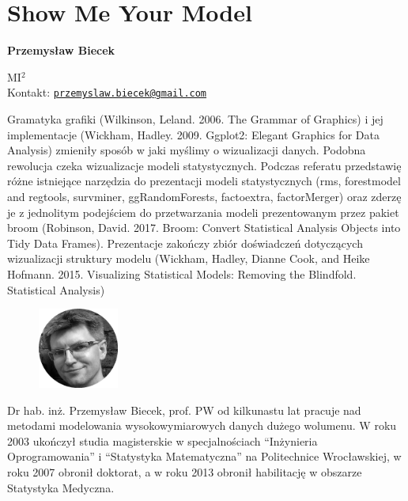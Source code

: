 \documentclass[\main/boa.tex]{subfiles}
\begin{document}
\section{Show Me Your Model}


\begin{minipage}{0.915\textwidth}
	\centering
  {\bf \LARGE {} Przemysław Biecek}
\end{minipage}

\begin{affiliations}
\begin{minipage}{0.915\textwidth}
\centering
\large MI$^{2}$  \\[1pt]
Kontakt: \href{mailto:przemyslaw.biecek@gmail.com}{\nolinkurl{przemyslaw.biecek@gmail.com}}\\
\end{minipage}
\end{affiliations}


Gramatyka grafiki (Wilkinson, Leland. 2006. The Grammar of Graphics) i jej implementacje (Wickham, Hadley. 2009. Ggplot2: Elegant Graphics for Data Analysis) zmieniły sposób w jaki myślimy o wizualizacji danych. Podobna rewolucja czeka wizualizacje modeli statystycznych. Podczas referatu przedstawię różne istniejące narzędzia do prezentacji modeli statystycznych (rms, forestmodel and regtools, survminer, \break ggRandomForests, factoextra, factorMerger) oraz zderzę je z jednolitym podejściem do przetwarzania modeli prezentowanym przez pakiet broom (Robinson, David. 2017. Broom: Convert Statistical Analysis Objects into Tidy Data Frames). Prezentacje zakończy zbiór doświadczeń dotyczących wizualizacji struktury modelu (Wickham, Hadley, Dianne Cook, and Heike Hofmann. 2015. Visualizing Statistical Models: Removing the Blindfold. Statistical Analysis) 

\bio  
\begin{figure}
    \includegraphics[width=100px]{img/guests/czarno_biale/pbiecek.png}
\end{figure} 
Dr hab. inż. Przemysław Biecek, prof. PW od kilkunastu lat pracuje nad metodami modelowania wysokowymiarowych danych dużego wolumenu. W roku 2003 ukończył studia magisterskie w specjalnościach “Inżynieria Oprogramowania” i “Statystyka Matematyczna” na Politechnice Wrocławskiej, w roku 2007 obronił doktorat, a w roku 2013 obronił habilitację w obszarze Statystyka Medyczna.
\end{document}
